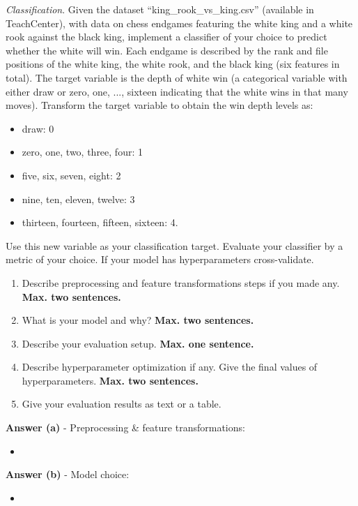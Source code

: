 \documentclass[a4paper,10pt]{article}
\begin{document}
\begin{enumerate}[topsep=0mm, partopsep=0mm, leftmargin=*]
\clearpage
{\color{blue}
\clearpage\item \textit{Classification}. Given the dataset ``king\_rook\_vs\_king.csv'' (available in TeachCenter), with data on chess endgames featuring the white king and a white rook against the black king, implement a classifier of your choice to predict whether the white will win. Each endgame is described by the rank and file positions of the white king, the white rook, and the black king (six features in total). The target variable is the depth of white win (a categorical variable with either draw or zero, one, ..., sixteen indicating that the white wins in that many moves). Transform the target variable to obtain the win depth levels as:
\begin{itemize}
	\item draw: 0
	\item zero, one, two, three, four: 1
	\item five, six, seven, eight: 2
	\item nine, ten, eleven, twelve: 3
	\item thirteen, fourteen, fifteen, sixteen: 4.
\end{itemize}
Use this new variable as your classification target. Evaluate your classifier by a metric of your choice. If your model has hyperparameters cross-validate.

\begin{enumerate}
\item Describe preprocessing and feature transformations steps if you made any. {\color{red}\textbf{Max. two sentences.}}
\item What is your model and why? {\color{red}\textbf{Max. two sentences.}}
\item Describe your evaluation setup. {\color{red}\textbf{Max. one sentence.}}
\item Describe hyperparameter optimization if any. Give the final values of hyperparameters. {\color{red}\textbf{Max. two sentences.}}
\item Give your evaluation results as text or a table.
\end{enumerate}
}

\textbf{Answer (a)} -  Preprocessing \& feature transformations:
\begin{itemize}
	\item 
\end{itemize}

\textbf{Answer (b)} - Model choice:
\begin{itemize}
	\item 
\end{itemize}


\end{enumerate}
\end{document}
